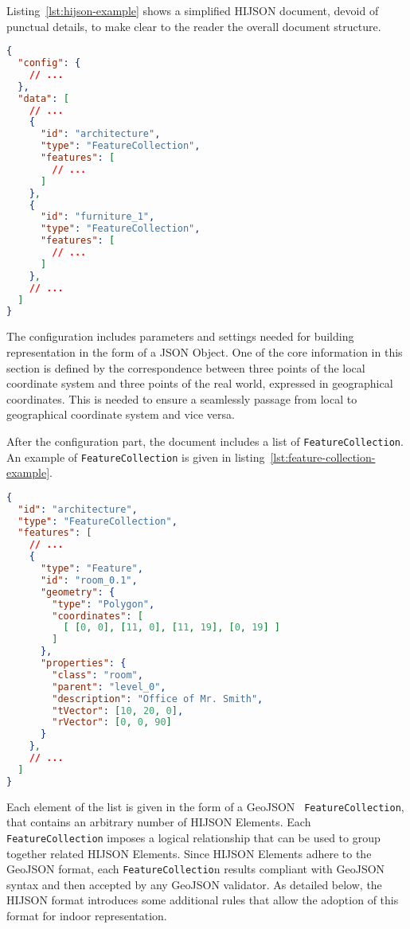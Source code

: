 Listing~\ref{lst:hijson-example} shows a simplified HIJSON document, devoid of punctual details, to make clear to the reader the overall document structure.


\begin{lstlisting}[language=json, label={lst:hijson-example}, captionpos=b, caption=Example of HIJSON document.]
{
  "config": {
    // ...
  },
  "data": [
    // ...
    {
      "id": "architecture",
      "type": "FeatureCollection",
      "features": [
        // ...
      ] 
    },
    {
      "id": "furniture_1",
      "type": "FeatureCollection",
      "features": [
        // ...
      ] 
    },
    // ...
  ]
}
\end{lstlisting}


The configuration includes parameters and settings needed for building representation in the form of a JSON Object. One of the core information in this section is defined by the correspondence between three points of the local coordinate system and three points of the real world, expressed in geographical coordinates. This is needed to ensure a seamlessly passage from local to geographical coordinate system and vice versa.

After the configuration part, the document includes a list of {\tt FeatureCollection}. An example
of {\tt FeatureCollection} is given in listing~\ref{lst:feature-collection-example}.


\begin{lstlisting}[language=json, label={lst:feature-collection-example}, captionpos=b,  caption=Example of {\tt FeatureCollection}.]
{
  "id": "architecture",
  "type": "FeatureCollection",
  "features": [
    // ...
    {
      "type": "Feature",
      "id": "room_0.1",
      "geometry": {
        "type": "Polygon",
        "coordinates": [
          [ [0, 0], [11, 0], [11, 19], [0, 19] ]
        ]
      },
      "properties": {
        "class": "room",
        "parent": "level_0",
        "description": "Office of Mr. Smith",
        "tVector": [10, 20, 0],
        "rVector": [0, 0, 90]
      }
    },
    // ...
  ]
}
\end{lstlisting}

Each element of the list is given in the form of a GeoJSON {\tt
FeatureCollection}, that contains an arbitrary  number of HIJSON Elements.
Each {\tt FeatureCollection} imposes a logical relationship that can be used
to group together related HIJSON Elements. Since  HIJSON Elements adhere to
the GeoJSON format, each {\tt FeatureCollectio}n results compliant with GeoJSON
syntax and then accepted by any GeoJSON validator. As detailed below, the
HIJSON format  introduces some additional rules that allow the adoption of
this format for indoor representation.


